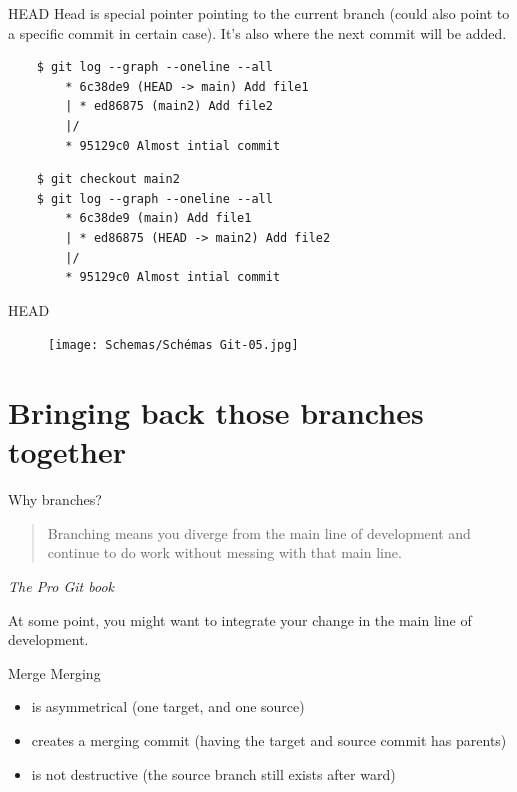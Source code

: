 \documentclass[10pt,aspectratio=169]{beamer}
\begin{document}
\begin{frame}[fragile]{HEAD}
    Head is special pointer pointing to the current branch (could also point to a specific commit in certain case). It's also where the next commit will be added.

    \begin{verbatim}
    $ git log --graph --oneline --all
        * 6c38de9 (HEAD -> main) Add file1
        | * ed86875 (main2) Add file2
        |/
        * 95129c0 Almost intial commit
    \end{verbatim}

    \begin{verbatim}
    $ git checkout main2
    $ git log --graph --oneline --all
        * 6c38de9 (main) Add file1
        | * ed86875 (HEAD -> main2) Add file2
        |/
        * 95129c0 Almost intial commit
    \end{verbatim}

\end{frame}

\begin{frame}[fragile]{HEAD}
    \begin{figure}
        \texttt{[image: Schemas/Schémas Git-05.jpg]}
    \end{figure}
\end{frame}

\section{Bringing back those branches together}

\begin{frame}[fragile]{Why branches?}
    \begin{quote}
        Branching means you diverge from the main line of development and continue to do work without messing with that main line.
    \end{quote}
    \begin{flushright}
        \textit{The Pro Git book}
    \end{flushright}

    At some point, you might want to integrate your change in the main line of development.
\end{frame}

\begin{frame}[fragile]{Merge}
    Merging
    \begin{itemize}
        \item is asymmetrical (one target, and one source)
        \item creates a merging commit (having the target and source commit has parents)
        \item is not destructive (the source branch still exists after ward)
    \end{itemize}
\end{frame}
\end{document}
